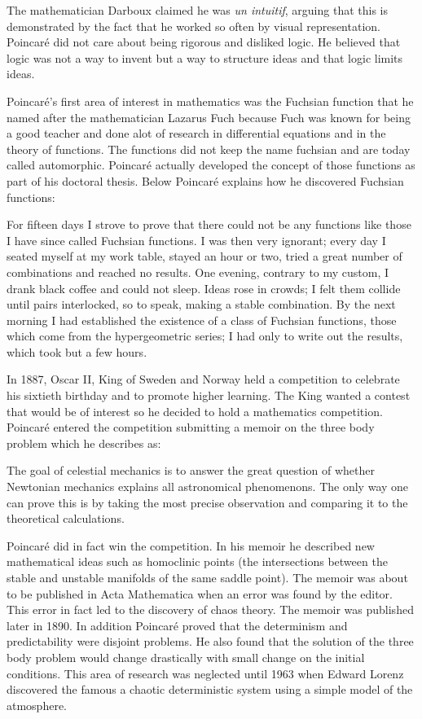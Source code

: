 The mathematician Darboux claimed he was \emph{un intuitif}, arguing that this is demonstrated by the fact that he worked so often by visual representation. Poincar\'{e} did not care about being rigorous and disliked logic. He believed that logic was not a way to invent but a way to structure ideas and that logic limits ideas. 

Poincar\'{e}'s first area of interest in mathematics was the Fuchsian function that he named after the mathematician Lazarus Fuch because Fuch was known for being a good teacher and done alot of research in differential equations and in the theory of functions. The functions did not keep the name fuchsian and are today called automorphic. Poincar\'{e} actually developed the concept of those functions as part of his doctoral thesis. Below Poincar\'{e} explains how he discovered Fuchsian functions:

For fifteen days I strove to prove that there could not be any functions like those I have since called Fuchsian functions. I was then very ignorant; every day I seated myself at my work table, stayed an hour or two, tried a great number of combinations and reached no results. One evening, contrary to my custom, I drank black coffee and could not sleep. Ideas rose in crowds; I felt them collide until pairs interlocked, so to speak, making a stable combination. By the next morning I had established the existence of a class of Fuchsian functions, those which come from the hypergeometric series; I had only to write out the results, which took but a few hours. 

In 1887, Oscar II, King of Sweden and Norway held a competition to celebrate his sixtieth birthday and to promote higher learning. The King wanted a contest that would be of interest so he decided to hold a mathematics competition. Poincar\'{e} entered the competition submitting a memoir on the three body problem which he describes as:

The goal of celestial mechanics is to answer the great question of whether Newtonian mechanics explains all astronomical phenomenons. The only way one can prove this is by taking the most precise observation and comparing it to the theoretical calculations.

Poincar\'{e} did in fact win the competition. In his memoir he described new mathematical ideas such as homoclinic points (the intersections between the stable and unstable manifolds of the same saddle point). The memoir was about to be published in Acta Mathematica when an error was found by the editor. This error in fact led to the discovery of chaos theory. The memoir was published later in 1890. In addition Poincar\'{e} proved that the determinism and predictability were disjoint problems. He also found that the solution of the three body problem would change drastically with small change on the initial conditions. This area of research was neglected until 1963 when Edward Lorenz discovered the famous a chaotic deterministic system using a simple model of the atmosphere.

